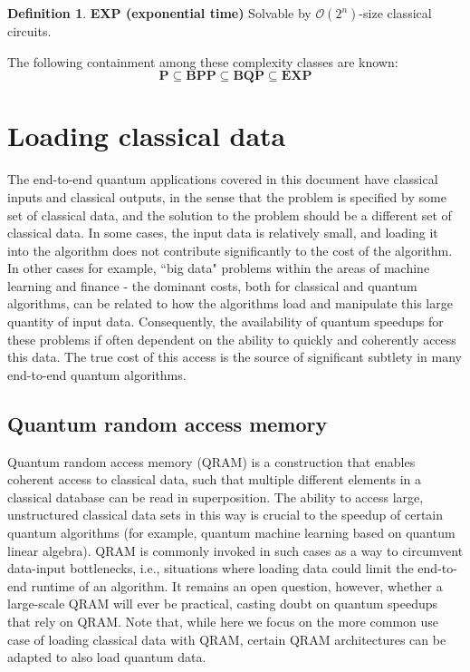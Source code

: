 \documentclass[12pt, oneside]{book}
\theoremstyle{definition}
\newtheorem{definition}{Definition}[section]
\theoremstyle{definition}
\theoremstyle{remark}
\begin{document}
\begin{definition}
    \textbf{EXP (exponential time)} Solvable by $\mathcal{O}(2^n)$-size classical circuits.
\end{definition}

The following containment among these complexity classes are known:
\[
\mathbf{P}\subseteq \mathbf{BPP} \subseteq \mathbf{BQP} \subseteq \mathbf{EXP}
\]


\chapter{Loading classical data}
The end-to-end quantum applications covered in this document have classical inputs and classical outputs, in the sense that the problem is specified by some set of classical data, and the solution to the problem should be a different set of classical data. In some cases, the input data is relatively small, and loading it into the algorithm does not contribute significantly to the cost of the algorithm. In other cases for example, ``big data" problems within the areas of machine learning and finance - the dominant costs, both for classical and quantum algorithms, can be related to how the algorithms load and manipulate this large quantity of input data. Consequently, the availability of quantum speedups for these problems if often dependent on the ability to quickly and coherently access this data. The true cost of this access is the source of significant subtlety in many end-to-end quantum algorithms.

\section{Quantum random access memory}
Quantum random access memory (QRAM) is a construction that enables coherent access to classical data, such that multiple different elements in a classical database can be read in superposition. The ability to access large, unstructured classical data sets in this way is crucial to the speedup of certain quantum algorithms (for example, quantum machine learning based on quantum linear algebra). QRAM is commonly invoked in such cases as a way to circumvent data-input bottlenecks, i.e., situations where loading data could limit the end-to-end runtime of an algorithm. It remains an open question, however, whether a large-scale QRAM will ever be practical, casting doubt on quantum speedups that rely on QRAM. Note that, while here we focus on the more common use case of loading classical data with QRAM, certain QRAM architectures can be adapted to also load quantum data.
\end{document}
